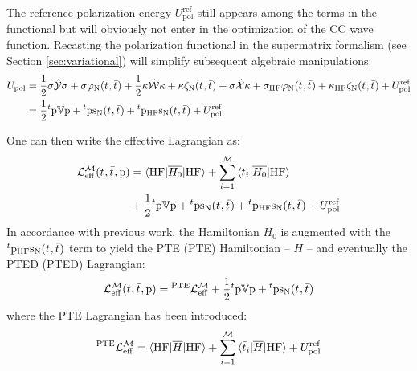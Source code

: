 The reference polarization energy $U_\mathrm{pol}^\mathrm{ref}$ still
appears among the terms in the functional but will obviously not enter
in the optimization of the \acrshort{CC} wave function.
Recasting the polarization functional in the supermatrix formalism (see
Section \ref{sec:variational}) will simplify subsequent algebraic
manipulations:
\begin{equation}
  \begin{aligned}
  U_\mathrm{pol} &=
    \frac{1}{2}\sigma\hat{\mathcal{Y}}\sigma
    + \sigma\varphi_{\mathrm{N}}(t_{},\bar{t}_{})
  + \frac{1}{2}\kappa\hat{\mathcal{W}}\kappa
  + \kappa\zeta_{\mathrm{N}}(t_{},\bar{t}_{})
  + \sigma\hat{\mathcal{X}}\kappa
  + \sigma_\mathrm{HF}\varphi_{\mathrm{N}}(t_{},\bar{t}_{}) +
  \kappa_\mathrm{HF}\zeta_{\mathrm{N}}(t_{},\bar{t}_{})
  + U_\mathrm{pol}^\mathrm{ref}
  \\
  &=
  \frac{1}{2}{}^t\mathrm{p}\mathbb{V}\mathrm{p} + {}^t\mathrm{p}\mathrm{s}_{\mathrm{N}}(t_{},\bar{t}_{})
  + {}^t\mathrm{p}_\mathrm{HF}\mathrm{s}_{\mathrm{N}}(t_{},\bar{t}_{})
  + U_\mathrm{pol}^\mathrm{ref}
\end{aligned}
\end{equation}

One can then write the effective Lagrangian as:
\begin{equation}
  \begin{aligned}
  \mathcal{L}^\mathcal{M}_\mathrm{eff}(t_{}, \bar{t}_{}, \mathrm{p}) &=
  \braket{\mathrm{HF} | \overline{H_0} | \mathrm{HF}}
  + \sum_{i=1}^{\mathcal{M}}\braket{t_{i} | \overline{H_0} | \mathrm{HF}} \\
  &+
  \frac{1}{2}{}^t\mathrm{p}\mathbb{V}\mathrm{p} + {}^t\mathrm{p}\mathrm{s}_{\mathrm{N}}(t_{},\bar{t}_{})
  + {}^t\mathrm{p}_\mathrm{HF}\mathrm{s}_{\mathrm{N}}(t_{},\bar{t}_{})
  + U_\mathrm{pol}^\mathrm{ref}
  \end{aligned}
\end{equation}
In accordance with previous work,\autocite{Cammi2009-gu,
Caricato2011-tx} the Hamiltonian $H_0$ is augmented with the
${}^t\mathrm{p}_\mathrm{HF}\mathrm{s}_{\mathrm{N}}(t_{},\bar{t}_{})$ term to yield the
\acrlong*{PTE} (\acrshort{PTE}) Hamiltonian -- $H$ -- and eventually the
\acrlong*{PTED} (\acrshort{PTED}) Lagrangian:~\autocite{Olivares del Valle,
Lipparini}
\begin{equation}\label{eq:pted-cc}
  \mathcal{L}^\mathcal{M}_\mathrm{eff}(t_{}, \bar{t}_{}, \mathrm{p}) =
  {}^\mathrm{PTE}\mathcal{L}^\mathcal{M}_\mathrm{eff}
  + \frac{1}{2}{}^t\mathrm{p}\mathbb{V}\mathrm{p} + {}^t\mathrm{p}\mathrm{s}_{\mathrm{N}}(t_{},\bar{t}_{})
\end{equation}
where the \acrshort{PTE} Lagrangian has been introduced:
\begin{equation}
{}^\mathrm{PTE}\mathcal{L}^\mathcal{M}_\mathrm{eff}
  =
  \braket{\mathrm{HF} | \overline{H} | \mathrm{HF}}
  + \sum_{i=1}^{\mathcal{M}}\braket{\bar{t}_{i} | \overline{H} | \mathrm{HF}}
  + U_\mathrm{pol}^\mathrm{ref}
\end{equation}

